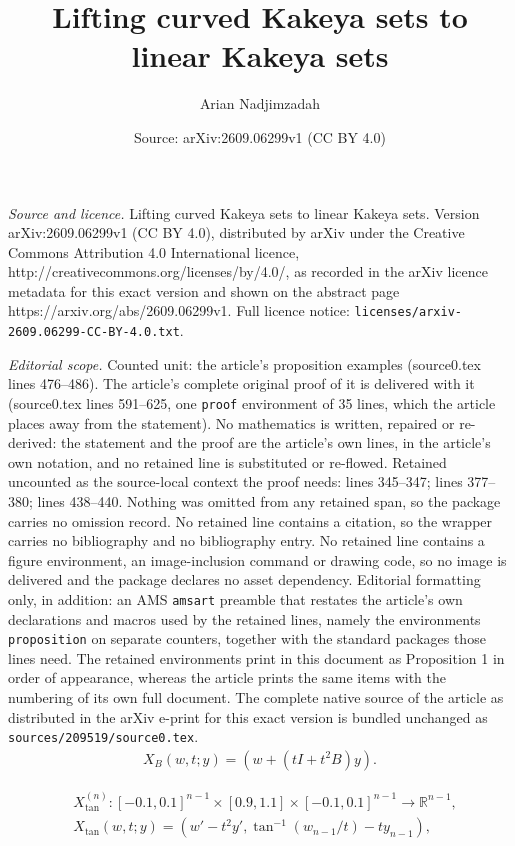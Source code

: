 \documentclass[10pt,a4paper]{amsart}
\title{Lifting curved Kakeya sets to linear Kakeya sets}
\author{Arian Nadjimzadah}
\date{Source: arXiv:2609.06299v1 (CC BY 4.0)}
\def\R{\mathbb{R}}
\begin{document}
\maketitle

\noindent\emph{Source and licence.} Lifting curved Kakeya sets to linear Kakeya sets. Version arXiv:2609.06299v1 (CC BY 4.0), distributed by arXiv under the Creative Commons Attribution 4.0 International licence, http://creativecommons.org/licenses/by/4.0/, as recorded in the arXiv licence metadata for this exact version and shown on the abstract page https://arxiv.org/abs/2609.06299v1. Full licence notice: \texttt{licenses/arxiv-2609.06299-CC-BY-4.0.txt}.\par\smallskip

\noindent\textit{Editorial scope.} Counted unit: the article's proposition examples (source0.tex lines 476--486). The article's complete original proof of it is delivered with it (source0.tex lines 591--625, one \texttt{proof} environment of 35 lines, which the article places away from the statement). No mathematics is written, repaired or re-derived: the statement and the proof are the article's own lines, in the article's own notation, and no retained line is substituted or re-flowed.  Retained uncounted as the source-local context the proof needs: lines 345--347; lines 377--380; lines 438--440.  Nothing was omitted from any retained span, so the package carries no omission record.  No retained line contains a citation, so the wrapper carries no bibliography and no bibliography entry.  No retained line contains a figure environment, an image-inclusion command or drawing code, so no image is delivered and the package declares no asset dependency.  Editorial formatting only, in addition: an AMS \texttt{amsart} preamble that restates the article's own declarations and macros used by the retained lines, namely the environments \texttt{proposition} on separate counters, together with the standard packages those lines need.  The retained environments print in this document as Proposition 1 in order of appearance, whereas the article prints the same items with the numbering of its own full document.  The complete native source of the article as distributed in the arXiv e-print for this exact version is bundled unchanged as \texttt{sources/209519/source0.tex}.
    \begin{align}\label{eq: quadratic def}
        X_B(w,t;y) = (w + (tI + t^2 B)y).
    \end{align}

    \begin{align}
        &X^{(n)}_{\tan} : [-0.1,0.1]^{n-1} \times [0.9,1.1] \times [-0.1,0.1]^{n-1} \to \R^{n-1}, \\
        &X_{\tan}(w,t;y) = (w'-t^2 y', \tan^{-1}(w_{n-1}/t)-ty_{n-1}), \label{eq: tan example def}
    \end{align}
\end{document}
